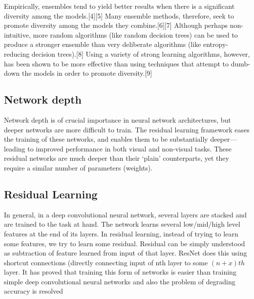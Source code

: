 \documentclass[12pt]{article}
\numberwithin{equation}{section}
\numberwithin{table}{section}
\numberwithin{figure}{section}
\begin{document}
Empirically, ensembles tend to yield better results when there is a significant diversity among the models.[4][5] Many ensemble methods, therefore, seek to promote diversity among the models they combine.[6][7] Although perhaps non-intuitive, more random algorithms (like random decision trees) can be used to produce a stronger ensemble than very deliberate algorithms (like entropy-reducing decision trees).[8] Using a variety of strong learning algorithms, however, has been shown to be more effective than using techniques that attempt to dumb-down the models in order to promote diversity.[9]

\subsection{Network depth}

Network depth is of crucial importance in neural network architectures, but deeper networks are more difficult to train. The residual learning framework eases the training of these networks, and enables them to be substantially deeper — leading to improved performance in both visual and non-visual tasks. These residual networks are much deeper than their ‘plain’ counterparts, yet they require a similar number of parameters (weights).

\subsection{Residual Learning}

In general, in a deep convolutional neural network, several layers are stacked and are trained to the task at hand. The network learns several low/mid/high level features at the end of its layers. In residual learning, instead of trying to learn some features, we try to learn some residual. Residual can be simply understood as subtraction of feature learned from input of that layer. ResNet does this using shortcut connections (directly connecting input of nth layer to some $(n+x)th$ layer. It has proved that training this form of networks is easier than training simple deep convolutional neural networks and also the problem of degrading accuracy is resolved
\end{document}
